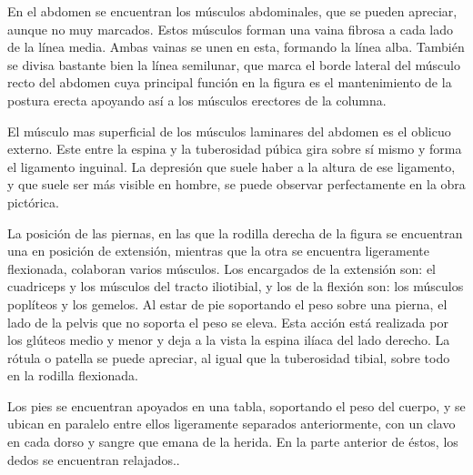 En el abdomen se encuentran los músculos abdominales, que se pueden apreciar, aunque no muy marcados. Estos músculos forman una vaina fibrosa a cada lado de la línea media. Ambas vainas se unen en esta, formando la línea alba. También se divisa bastante bien la línea semilunar, que marca el borde lateral del músculo recto del abdomen cuya principal función en la figura es el mantenimiento de la postura erecta apoyando así a los músculos erectores de la columna.

El músculo mas superficial de los músculos laminares del abdomen es el oblicuo externo. Este entre la espina y la tuberosidad púbica gira sobre sí mismo y forma el ligamento inguinal. La depresión que suele haber a la altura de ese ligamento, y que suele ser más visible en hombre, se puede observar perfectamente en la obra pictórica.

La posición de las piernas, en las que la rodilla derecha de la figura se encuentran una en posición de extensión, mientras que la otra se encuentra ligeramente flexionada, colaboran varios músculos. Los encargados de la extensión son: el cuadriceps y los músculos del tracto iliotibial, y los de la flexión son: los músculos poplíteos y los gemelos. Al estar de pie soportando el peso sobre una pierna, el lado de la pelvis que no soporta el peso se eleva. Esta acción está realizada por los glúteos medio y menor y deja a la vista la espina ilíaca del lado derecho.
La rótula o patella se puede apreciar, al igual que la tuberosidad tibial, sobre todo en la rodilla flexionada.

Los pies se encuentran apoyados en una tabla, soportando el peso del cuerpo, y se ubican en paralelo entre ellos ligeramente separados anteriormente, con un clavo en cada dorso y sangre que emana de la herida. En la parte anterior de éstos, los dedos se encuentran relajados..